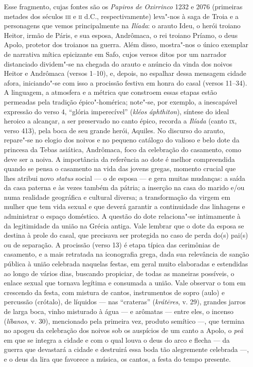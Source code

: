 {{\small Esse fragmento, cujas fontes são os \textit{Papiros de Oxirrinco} 1232 e 2076
(primeiras metades dos séculos \textsc{iii} e \textsc{ii} d.C., respectivamente) leva"-nos à saga
de Troia e a personagens que vemos principalmente na \textit{Ilíada}: o arauto
Ideu, o herói troiano Heitor, irmão de Páris, e sua esposa, Andrômaca, o rei
troiano Príamo, o deus Apolo, protetor dos troianos na guerra. Além disso,
mostra"-nos o único exemplar de narrativa mítica epicizante
em Safo, cujos versos ditos por um narrador distanciado dividem"-se na
chegada do arauto e anúncio da vinda dos noivos Heitor e Andrômaca (versos
1--10), e, depois, no espalhar dessa mensagem cidade afora, iniciando"-se com
isso a procissão festiva em honra do casal (versos 11--34). A linguagem, a
atmosfera e a métrica que constroem essas etapas estão permeadas pela tradição
épico"-homérica; note"-se, por exemplo, a inescapável expressão do verso 4,
``glória imperecível” (\textit{kléos áphthiton}), síntese do ideal heroico a alcançar, a
ser preservado no canto épico, recorda a \textit{Ilíada }(canto \textsc{ix}, verso 413),
pela boca de seu grande herói, Aquiles. No discurso do arauto, repare"-se no
elogio dos noivos e no pequeno catálogo do valioso e belo dote da princesa da
Tebas asiática, Andrômaca, foco da celebração do casamento, como deve ser a noiva.
A importância da
referência ao dote é melhor
compreendida quando se pensa o casamento na vida das jovens gregas, momento
crucial que lhes atribui novo \textit{status} social --- o de esposa --- e gera
muitas mudanças: a saída da casa paterna e às vezes também da pátria; a
inserção na casa do marido e/ou numa realidade geográfica e cultural diversa; a
transformação da virgem em mulher que tem vida sexual e que deverá garantir a
continuidade das linhagens e administrar o espaço doméstico. A questão do dote
relaciona"-se intimamente à da legitimidade da união na Grécia antiga. Vale
lembrar que o dote da esposa se destina à prole do casal, que precisava ser
protegida no caso de perda do(s) pai(s) ou de separação. A procissão (verso
13) é etapa típica das cerimônias de casamento, e a mais retratada na iconografia grega, dada sua relevância de sanção pública à união celebrada naquelas festas, em geral muito elaboradas e
estendidas ao longo de vários dias, buscando propiciar, de todas as maneiras
possíveis, o enlace sexual que tornava legítima e consumada a união.
Vale observar o tom em crescendo da festa, com mistura de cantos, instrumentos de sopro (aulo) e percussão (crótalo), de líquidos --- nas ``crateras'' (\textit{krátēres}, v. 29), grandes jarros de larga boca, vinho misturado à água --- e arômatas  --- entre eles, o incenso (\textit{líbanos}, v. 30), mencionado pela primeira vez, produto semítico ---, que termina no apogeu da celebração dos noivos sob os auspícios de um canto a Apolo, o \textit{peâ} em que se integra a cidade e com o qual louva o deus do arco e flecha --- da guerra que devastará a cidade e destruirá essa boda tão alegremente celebrada ---, e o deus da lira que favorece a música, os cantos, a festa do tempo presente. 
}}
